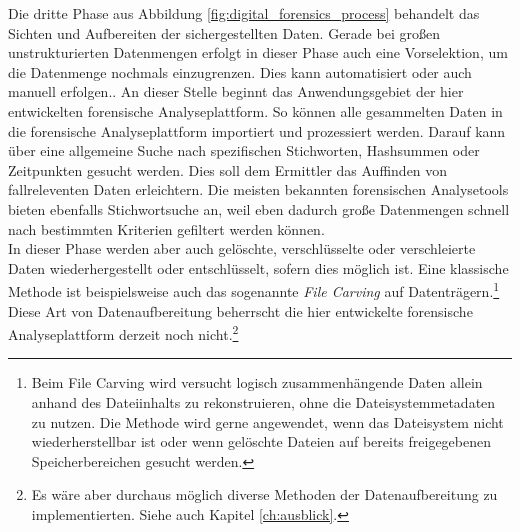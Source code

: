 \noindent
Die dritte Phase aus Abbildung \ref{fig:digital_forensics_process} behandelt das Sichten und Aufbereiten der sichergestellten Daten. Gerade bei großen unstrukturierten Datenmengen erfolgt in dieser Phase auch eine Vorselektion, um die Datenmenge nochmals einzugrenzen. Dies kann automatisiert oder auch manuell erfolgen.\cite[S. 33-39]{digital_forensics}. An dieser Stelle beginnt das Anwendungsgebiet der hier entwickelten forensische Analyseplattform. 
So können alle gesammelten Daten in die forensische Analyseplattform importiert und prozessiert werden. Darauf kann über eine allgemeine Suche nach spezifischen Stichworten, Hashsummen oder Zeitpunkten gesucht werden. Dies soll dem Ermittler das Auffinden von fallreleventen Daten erleichtern. Die meisten bekannten forensischen Analysetools bieten ebenfalls Stichwortsuche an, weil eben dadurch große Datenmengen schnell nach bestimmten Kriterien gefiltert werden können.\cite[S. 116-123]{handbook_digital_forensics}\\
In dieser Phase werden aber auch gelöschte, verschlüsselte oder verschleierte Daten wiederhergestellt oder entschlüsselt, sofern dies möglich ist. Eine klassische Methode ist beispielsweise auch das sogenannte \textit{File Carving} auf Datenträgern.\cite[S. 38-39]{digital_forensics}\footnote{Beim File Carving wird versucht logisch zusammenhängende Daten allein anhand des Dateiinhalts zu rekonstruieren, ohne die Dateisystemmetadaten zu nutzen. Die Methode wird gerne angewendet, wenn das Dateisystem nicht wiederherstellbar ist oder wenn gelöschte Dateien auf bereits freigegebenen Speicherbereichen gesucht werden.} Diese Art von Datenaufbereitung beherrscht die hier entwickelte forensische Analyseplattform derzeit noch nicht.\footnote{Es wäre aber durchaus möglich diverse Methoden der Datenaufbereitung zu implementierten. Siehe auch Kapitel \ref{ch:ausblick}.}\\

